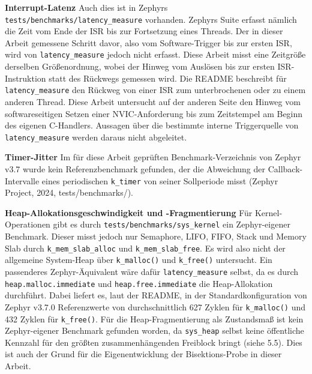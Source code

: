 \textbf{Interrupt-Latenz }Auch dies ist in Zephyrs \lstinline[style=fileinline]|tests/benchmarks/latency_measure| vorhanden. Zephyrs Suite erfasst nämlich die Zeit vom Ende der ISR bis zur Fortsetzung eines Threads. Der in dieser Arbeit gemessene Schritt davor, also vom Software-Trigger bis zur ersten ISR, wird von \lstinline[style=fileinline]|latency_measure| jedoch nicht erfasst. Diese Arbeit misst eine Zeitgröße derselben Größenordnung, wobei der Hinweg vom Auslösen bis zur ersten ISR-Instruktion statt des Rückwegs gemessen wird. Die README beschreibt für \lstinline[style=fileinline]|latency_measure| den Rückweg von einer ISR zum unterbrochenen oder zu einem anderen Thread. Diese Arbeit untersucht auf der anderen Seite den Hinweg vom softwareseitigen Setzen einer NVIC-Anforderung bis zum Zeitstempel am Beginn des eigenen C-Handlers. Aussagen über die bestimmte interne Triggerquelle von \lstinline[style=fileinline]|latency_measure| werden daraus nicht abgeleitet.

\textbf{Timer-Jitter }Im für diese Arbeit geprüften Benchmark-Verzeichnis von Zephyr v3.7 wurde kein Referenzbenchmark gefunden, der die Abweichung der Callback-Intervalle eines periodischen \lstinline[style=fileinline]|k_timer| von seiner Sollperiode misst (Zephyr Project, 2024, tests/benchmarks/).

\textbf{Heap-Allokationsgeschwindigkeit und -Fragmentierung }Für Kernel-Operationen gibt es durch \lstinline[style=fileinline]|tests/benchmarks/sys_kernel| ein Zephyr-eigener Benchmark. Dieser misst jedoch nur Semaphore, LIFO, FIFO, Stack und Memory Slab durch \lstinline[style=fileinline]|k_mem_slab_alloc| und \lstinline[style=fileinline]|k_mem_slab_free|. Es wird also nicht der allgemeine System-Heap über \lstinline[style=fileinline]|k_malloc()| und \lstinline[style=fileinline]|k_free()| untersucht. Ein passenderes Zephyr-Äquivalent wäre dafür \lstinline[style=fileinline]|latency_measure| selbst, da es durch \lstinline[style=fileinline]|heap.malloc.immediate| und \lstinline[style=fileinline]|heap.free.immediate| die Heap-Allokation durchführt. Dabei liefert es, laut der README, in der Standardkonfiguration von Zephyr v3.7.0 Referenzwerte von durchschnittlich 627 Zyklen für \lstinline[style=fileinline]|k_malloc()| und 432 Zyklen für \lstinline[style=fileinline]|k_free()|. Für die Heap-Fragmentierung als Zustandsmaß ist kein Zephyr-eigener Benchmark gefunden worden, da \lstinline[style=fileinline]|sys_heap| selbst keine öffentliche Kennzahl für den größten zusammenhängenden Freiblock bringt (siehe 5.5). Dies ist auch der Grund für die Eigenentwicklung der Bisektions-Probe in dieser Arbeit.

